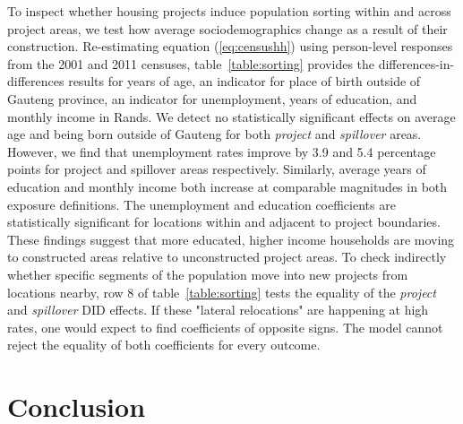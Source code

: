 \documentclass[12pt]{article}
\begin{document}
To inspect whether housing projects induce population sorting within and across proj\-ect areas, we test how average sociodemographics change as a result of their construction.  Re-estimating equation (\ref{eq:censushh}) using person-level responses from the 2001 and 2011 censuses, table~\ref{table:sorting} provides the differences-in-differences results for years of age, an indicator for place of birth outside of Gauteng province, an indicator for unemployment, years of education, and monthly income in Rands.  We detect no statistically significant effects on average age and being born outside of Gauteng for both {\it project} and {\it spillover} areas.  However, we find that unemployment rates improve by 3.9 and 5.4 percentage points for project and spillover areas respectively.  Similarly, average years of education and monthly income both increase at comparable magnitudes in both exposure definitions.  The unemployment and education coefficients are statistically significant for locations within and adjacent to project boundaries.  These findings suggest that more educated, higher income households are moving to constructed areas relative to unconstructed project areas. To check indirectly whether specific segments of the population move into  new projects from locations nearby, row 8 of table~\ref{table:sorting} tests the equality of the {\it project} and {\it spillover} DID effects. If these "lateral relocations" are happening at high rates, one would expect to find coefficients of opposite signs. The model cannot reject the equality of both coefficients for every outcome. 







\section{Conclusion}\label{section:discussion}
\end{document}
